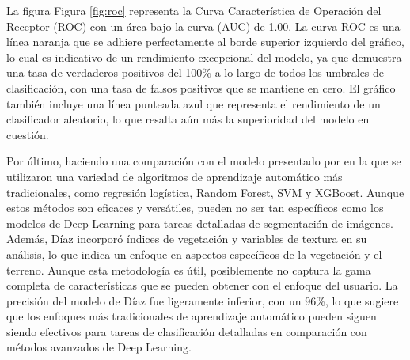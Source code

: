 La figura Figura \ref{fig:roc} representa la Curva Característica de Operación del Receptor (ROC) con un área bajo la curva (AUC) de 1.00. La curva ROC es una línea naranja que se adhiere perfectamente al borde superior izquierdo del gráfico, lo cual es indicativo de un rendimiento excepcional del modelo, ya que demuestra una tasa de verdaderos positivos del 100\% a lo largo de todos los umbrales de clasificación, con una tasa de falsos positivos que se mantiene en cero. El gráfico también incluye una línea punteada azul que representa el rendimiento de un clasificador aleatorio, lo que resalta aún más la
superioridad del modelo en cuestión.

Por último, haciendo una comparación con el modelo presentado por \cite{diaz2023} en la que se utilizaron una variedad de algoritmos de aprendizaje automático más tradicionales, como regresión logística, Random Forest, SVM y XGBoost. Aunque estos métodos son eficaces y versátiles, pueden no ser tan específicos como los modelos de Deep Learning para tareas detalladas de segmentación de imágenes. Además, Díaz incorporó índices de vegetación y variables de textura en su análisis, lo que indica un enfoque en aspectos específicos de la vegetación y el terreno. Aunque esta metodología es útil, posiblemente no captura la gama completa de características que se pueden obtener con el enfoque del usuario. La precisión del modelo de Díaz fue ligeramente inferior, con un 96\%, lo que sugiere que los enfoques más tradicionales de aprendizaje automático pueden siguen siendo efectivos para tareas de clasificación detalladas en comparación con métodos avanzados de Deep Learning.
